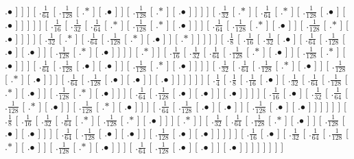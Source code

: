 \documentclass[a4paper,10pt]{article}
\begin{document}
\begin{landscape}
{.$\bullet$ ]  ]  ]  [ .$\frac{1}{64}$  [ .$\frac{1}{128}$  [ .$*$ ]  [ .$\bullet$ ]  ]  [ .$\frac{1}{128}$  [ .$*$ ]  [ .$\bullet$ ]  ]  ]  ]  [ .$\frac{1}{32}$  [ .$*$ ]  [ .$\frac{1}{64}$  [ .$*$ ]  [ .$\frac{1}{128}$  [ .$\bullet$ ]  [ .$\bullet$ ]  ]  ]  ]  ]  [ .$\frac{1}{16}$  [ .$\frac{1}{32}$  [ .$\frac{1}{64}$  [ .$*$ ]  [ .$\frac{1}{128}$  [ .$*$ ]  [ .$\bullet$ ]  ]  ]  [ .$\frac{1}{64}$  [ .$\frac{1}{128}$  [ .$*$ ]  [ .$\bullet$ ]  ]  [ .$\frac{1}{128}$  [ .$*$ ]  [ .$\bullet$ ]  ]  ]  ]  [ .$\frac{1}{32}$  [ .$*$ ]  [ .$\frac{1}{64}$  [ .$\frac{1}{128}$  [ .$*$ ]  [ .$\bullet$ ]  ]  [ .$*$ ]  ]  ]  ]  ]  [ .$\frac{1}{8}$  [ .$\frac{1}{16}$  [ .$\frac{1}{32}$  [ .$\bullet$ ]  [ .$\frac{1}{64}$  [ .$\frac{1}{128}$  [ .$\bullet$ ]  [ .$\bullet$ ]  ]  [ .$\frac{1}{128}$  [ .$*$ ]  [ .$\bullet$ ]  ]  ]  ]  [ .$*$ ]  ]  [ .$\frac{1}{16}$  [ .$\frac{1}{32}$  [ .$\frac{1}{64}$  [ .$\frac{1}{128}$  [ .$*$ ]  [ .$\bullet$ ]  ]  [ .$\frac{1}{128}$  [ .$*$ ]  [ .$\bullet$ ]  ]  ]  [ .$\frac{1}{64}$  [ .$\frac{1}{128}$  [ .$\bullet$ ]  [ .$\bullet$ ]  ]  [ .$\frac{1}{128}$  [ .$*$ ]  [ .$\bullet$ ]  ]  ]  ]  [ .$\frac{1}{32}$  [ .$\frac{1}{64}$  [ .$\frac{1}{128}$  [ .$*$ ]  [ .$\bullet$ ]  ]  [ .$\frac{1}{128}$  [ .$*$ ]  [ .$\bullet$ ]  ]  ]  [ .$\frac{1}{64}$  [ .$\frac{1}{128}$  [ .$\bullet$ ]  [ .$\bullet$ ]  ]  [ .$\bullet$ ]  ]  ]  ]  ]  ]  [ .$\frac{1}{4}$  [ .$\frac{1}{8}$  [ .$\frac{1}{16}$  [ .$\bullet$ ]  [ .$\frac{1}{32}$  [ .$\frac{1}{64}$  [ .$\frac{1}{128}$  [ .$*$ ]  [ .$\bullet$ ]  ]  [ .$\frac{1}{128}$  [ .$*$ ]  [ .$\bullet$ ]  ]  ]  [ .$\frac{1}{64}$  [ .$\frac{1}{128}$  [ .$\bullet$ ]  [ .$\bullet$ ]  ]  [ .$\bullet$ ]  ]  ]  ]  [ .$\frac{1}{16}$  [ .$\bullet$ ]  [ .$\frac{1}{32}$  [ .$\frac{1}{64}$  [ .$\frac{1}{128}$  [ .$*$ ]  [ .$\bullet$ ]  ]  [ .$\frac{1}{128}$  [ .$*$ ]  [ .$\bullet$ ]  ]  ]  [ .$\frac{1}{64}$  [ .$\frac{1}{128}$  [ .$\bullet$ ]  [ .$\bullet$ ]  ]  [ .$\frac{1}{128}$  [ .$\bullet$ ]  [ .$\bullet$ ]  ]  ]  ]  ]  ]  [ .$\frac{1}{8}$  [ .$\frac{1}{16}$  [ .$\frac{1}{32}$  [ .$\frac{1}{64}$  [ .$*$ ]  [ .$\frac{1}{128}$  [ .$*$ ]  [ .$\bullet$ ]  ]  ]  [ .$*$ ]  ]  [ .$\frac{1}{32}$  [ .$\frac{1}{64}$  [ .$\frac{1}{128}$  [ .$*$ ]  [ .$\bullet$ ]  ]  [ .$\frac{1}{128}$  [ .$\bullet$ ]  [ .$\bullet$ ]  ]  ]  [ .$\frac{1}{64}$  [ .$\frac{1}{128}$  [ .$\bullet$ ]  [ .$\bullet$ ]  ]  [ .$\frac{1}{128}$  [ .$\bullet$ ]  [ .$\bullet$ ]  ]  ]  ]  ]  [ .$\frac{1}{16}$  [ .$\bullet$ ]  [ .$\frac{1}{32}$  [ .$\frac{1}{64}$  [ .$\frac{1}{128}$  [ .$*$ ]  [ .$\bullet$ ]  ]  [ .$\frac{1}{128}$  [ .$*$ ]  [ .$\bullet$ ]  ]  ]  [ .$\frac{1}{64}$  [ .$\frac{1}{128}$  [ .$\bullet$ ]  [ .$\bullet$ ]  ]  [ .$\bullet$ ]  ]  ]  ]  ]  ]  ]  ] 
}

\end{landscape}
\end{document}
